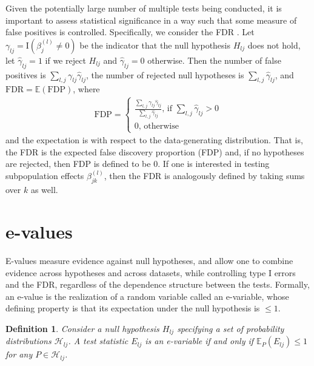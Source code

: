 \documentclass[pdflatex,sn-mathphys-num]{sn-jnl}%
\theoremstyle{thmstyleone}%
\theoremstyle{thmstyletwo}%
\theoremstyle{thmstylethree}%
\newtheorem{definition}{Definition}%
\begin{document}
Given the potentially large number of multiple tests being conducted, it is important to assess statistical significance in a way such that some measure of false positives is controlled.
Specifically, we consider the FDR \citep{benjamini:1995}. Let $\gamma_{lj}= \mbox{I}(\beta_j^{(l)} \neq 0)$ be the indicator that the null hypothesis $H_{lj}$ does not hold, let $\hat{\gamma}_{lj} = 1$ if we reject $H_{lj}$ and $\hat{\gamma}_{lj}=0$ otherwise. 
Then the number of false positives is $\sum_{l,j} \gamma_{lj} \hat{\gamma}_{lj}$, the number of rejected null hypotheses is $\sum_{l,j} \hat{\gamma}_{lj}$, and $\mbox{FDR}= \mathbb E(\mbox{FDP})$, where 
\begin{align}
 \mbox{FDP}= \begin{cases}
\frac{\sum_{l,j} \gamma_{lj} \hat{\gamma}_{lj}}{\sum_{l,j} \hat{\gamma}_{lj}} \mbox{, if } \sum_{l,j} \hat{\gamma}_{lj} > 0
\nonumber \\
0  \mbox{, otherwise} 
\end{cases}
\nonumber
\end{align}
and the expectation is with respect to the data-generating distribution.
That is, the FDR is the expected false discovery proportion (FDP) and, if no hypotheses are rejected, then FDP is defined to be 0.
If one is interested in testing subpopulation effects $\beta_{jk}^{(l)}$, then the FDR is analogously defined by taking sums over $k$ as well.



\section{e-values}
\label{sec:evalues}

\color{blue} E-values \citep{vovk:2021,gruenwald:2024,chugg:2026,ramdas:2025} measure evidence against null hypotheses, and allow one to combine evidence across hypotheses and across datasets, while controlling type I errors and the FDR, \color{black}
regardless of the dependence structure between the tests.
Formally, an e-value is the realization of a random variable called an e-variable, whose defining property is that its expectation under the null hypothesis is $\leq 1$.

\begin{definition}
Consider a null hypothesis $H_{lj}$ specifying a set of probability distributions $\mathcal{H}_{lj}$.
A test statistic $E_{lj}$ is an e-variable if and only if
$\mathbb E_P (E_{lj}) \leq 1$ for any $P \in \mathcal{H}_{lj}$.
\label{def:evariable}
\end{definition}
\end{document}
